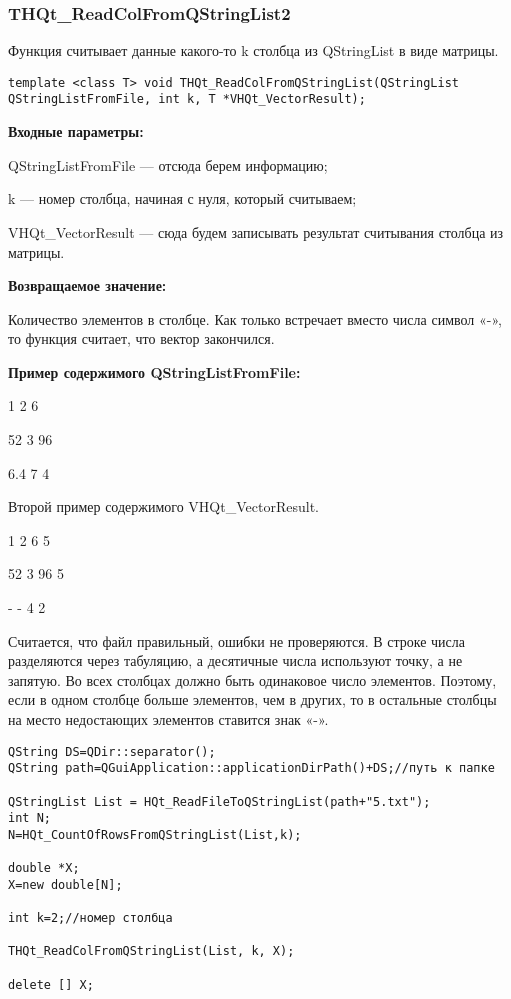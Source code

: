 \documentclass[a4paper,12pt]{article}
\begin{document}
\subsubsection{THQt\_ReadColFromQStringList2}\label{THQt_ReadColFromQStringList2}

Функция считывает данные какого-то k столбца из QStringList в виде матрицы.


\begin{lstlisting}[label=code_syntax_THQt_ReadColFromQStringList2,caption=Синтаксис]
template <class T> void THQt_ReadColFromQStringList(QStringList QStringListFromFile, int k, T *VHQt_VectorResult);
\end{lstlisting}

\textbf{Входные параметры:}

QStringListFromFile --- отсюда берем информацию;

     k --- номер столбца, начиная с нуля, который считываем;
	 
     VHQt\_VectorResult --- сюда будем записывать результат считывания столбца из матрицы.

\textbf{Возвращаемое значение:}

Количество элементов в столбце. Как только встречает вместо числа символ «-», то функция считает, что вектор закончился.

\textbf{Пример содержимого QStringListFromFile:}

1	2	6

52	3	96

6.4	7	4

    Второй пример содержимого VHQt\_VectorResult.
	
1	2	6	5

52	3	96	5

-	-	4   2

Считается, что файл правильный, ошибки не проверяются. В строке числа разделяются через табуляцию, а десятичные числа используют точку, а не запятую. Во всех столбцах должно быть одинаковое число элементов. Поэтому, если в одном столбце больше элементов, чем в других, то в остальные столбцы на место недостающих элементов ставится знак «-».


\begin{lstlisting}[label=code_use_THQt_ReadColFromQStringList2,caption=Пример использования]
QString DS=QDir::separator();
QString path=QGuiApplication::applicationDirPath()+DS;//путь к папке

QStringList List = HQt_ReadFileToQStringList(path+"5.txt");
int N;
N=HQt_CountOfRowsFromQStringList(List,k);

double *X;
X=new double[N];

int k=2;//номер столбца

THQt_ReadColFromQStringList(List, k, X);

delete [] X;
\end{lstlisting}
\end{document}
